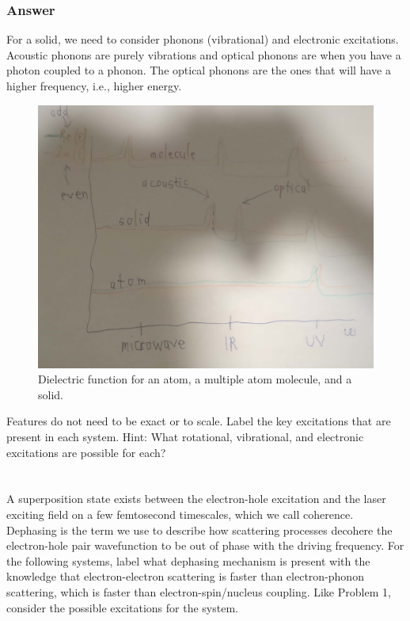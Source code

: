 \documentclass[12pt]{article}
\begin{document}
\subsubsection{Answer}
For a solid, we need to consider phonons (vibrational) and electronic excitations.
Acoustic phonons are purely vibrations and optical phonons are when you have a photon coupled to a phonon. The optical phonons are the ones that will have a higher frequency, i.e., higher energy.\\
\begin{figure}[h]
\centering
\includegraphics[width=\textwidth]{dielectrics_v2.jpg}
\caption{Dielectric function for an atom, a multiple atom molecule, and a solid.}
\end{figure}
Features do not need to be exact or to scale. Label the key excitations that are present in each system. Hint: What rotational, vibrational, and electronic excitations are possible for each?

\section{}
A superposition state exists between the electron-hole excitation and the laser exciting field on a few femtosecond timescales, which we call coherence. Dephasing is the term we use to describe how scattering processes decohere the electron-hole pair wavefunction to be out of phase with the driving frequency. For the following systems, label what dephasing mechanism is present with the knowledge that electron-electron scattering is faster than electron-phonon scattering, which is faster than electron-spin/nucleus coupling. Like Problem 1, consider the possible excitations for the system.
\end{document}
